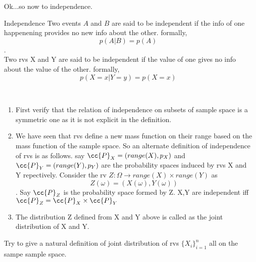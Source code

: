 \documentclass{myclass}
\begin{document}
Ok...so now to independence.
\begin{redthm}{Independence}
    Two events $A$ and $B$ are said to be independent if the info of one happenening provides no new info about the other.
    formally,$$p(A|B)=p(A)$$.\\
    Two rvs X and Y are said to be independent if the value of one gives no info about the value of the other.
    formally,$$p(X=x|Y=y)=p(X=x)$$
\end{redthm}
\begin{remarks}
    \hspace{1cm}\\
    \begin{enumerate}
        \item First verify that the relation of independence on subsets of sample space is a symmetric one as it is not explicit in the definition.
        \item We have seen that rvs define a new mass function on their range based on the mass function of the sample space. So an alternate definition of independence of rvs is as follows.
                say $\cc{P}_X=(range(X),p_X)$ and $\cc{P}_Y=(range(Y),p_Y)$ are the probability spaces induced by rvs X and Y repectively. Consider the rv $Z:\Omega\to range(X)\times range(Y)$ as $$Z(\omega)=(X(\omega),Y(\omega))$$.
                Say $\cc{P}_Z$ is the probability space formed by Z. X,Y are independent iff $\cc{P}_Z=\cc{P}_X\times\cc{P}_Y$  
        \item The distribution Z defined from X and Y above is called as the joint distribution of X and Y. 
    \end{enumerate}
\end{remarks}
\begin{exe}
    Try to give a natural definition of joint distribution of rvs $\{X_i\}_{i=1}^n$ all on the sampe sample space.
\end{exe}
\end{document}
